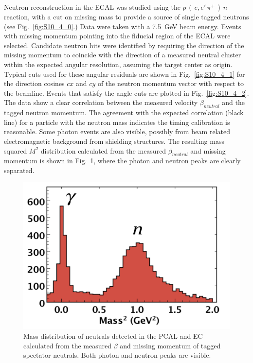 Neutron reconstruction in the ECAL was studied using the $p\,(\,e,e'\,\pi^+\,)\,n$ reaction, with a cut on missing mass 
to provide a source of single tagged neutrons (see Fig.~\ref{fig:S10_4_0}.) Data were taken with a 7.5~GeV beam energy. 
Events with missing momentum pointing into the fiducial region of the ECAL were selected. Candidate neutron hits were identified by
requiring the direction of the missing momentum to coincide with the direction of a measured neutral cluster within
the expected angular resolution, assuming the target center as origin. Typical cuts used for these angular
residuals are shown in Fig.~\ref{fig:S10_4_1} for the direction cosines $cx$ and $cy$ of the neutron momentum
vector with respect to the beamline. Events that satisfy the angle cuts are plotted in Fig.~\ref{fig:S10_4_2}. The
data show a clear correlation between the measured velocity $\beta_{neutral}$ and the tagged neutron momentum. The agreement with 
the expected correlation (black line) for a particle with the neutron mass indicates the timing calibration is reasonable.  
Some photon events are also visible, possibly from beam related electromagnetic background from shielding structures.  The resulting mass 
squared $M^2$ distribution calculated from the measured $\beta_{neutral}$ and missing momentum is shown 
in Fig.~\ref{fig:S10_4_3}, where the photon and neutron peaks are clearly separated. 

\begin{figure}[h]
\centering
\includegraphics[width=1.0\columnwidth,keepaspectratio]{img/S10_4_3.png}
\caption[]{Mass distribution of neutrals detected in the PCAL and EC calculated from the measured $\beta$
  and missing momentum of tagged spectator neutrals. Both photon and neutron peaks are visible.}
\label{fig:S10_4_3}
\end{figure}
